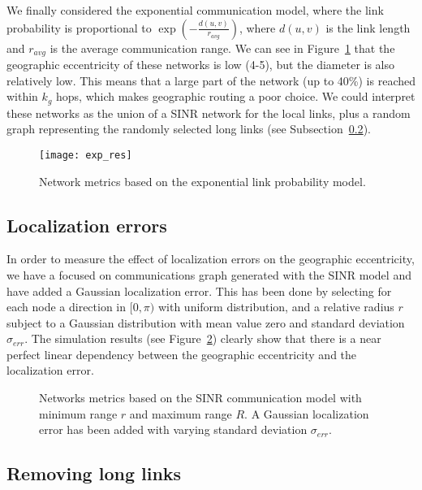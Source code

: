 \documentclass{article}
\begin{document}
We finally considered the exponential communication model, where the link probability is proportional to $\exp(-\frac{d(u,v)}{r_{avg}})$, where $d(u,v)$ is the link length and $r_{avg}$ is the average communication range. We can see in Figure~\ref{fig_exp} that the geographic eccentricity of these networks is low (4-5), but the diameter is also relatively low. This means that a large part of the network (up to 40\%) is reached within $k_g$ hops, which makes geographic routing a poor choice. We could interpret these networks as the union of a SINR network for the local links, plus a random graph representing the randomly selected long links (see Subsection~\ref{sub_trunc}).
\begin{figure}[h]
\begin{center}
\texttt{[image: exp\_res]}
\caption{Network metrics based on the exponential link probability model.}
\label{fig_exp}
\end{center}
\end{figure}

\subsection{Localization errors}
In order to measure the effect of localization errors on the geographic eccentricity, we have a focused on communications graph generated with the SINR model and have added a Gaussian localization error.
 This has been done by selecting for each node a direction in $[0,\pi)$ with uniform distribution, and a relative radius $r$ subject to a Gaussian distribution with mean value zero and standard deviation $\sigma_{err}$. The simulation results (see Figure~\ref{fig_sinr_e}) clearly show that there is a near perfect linear dependency between the geographic eccentricity and the localization error.
\begin{figure}[h]
\begin{center}
\caption{Networks metrics based on the SINR communication model with minimum range $r$ and maximum range $R$. A Gaussian localization error has been added with varying standard deviation $\sigma_{err}$.}
\label{fig_sinr_e}
\end{center}
\end{figure}

\subsection{Removing long links}
\label{sub_trunc}
\end{document}
